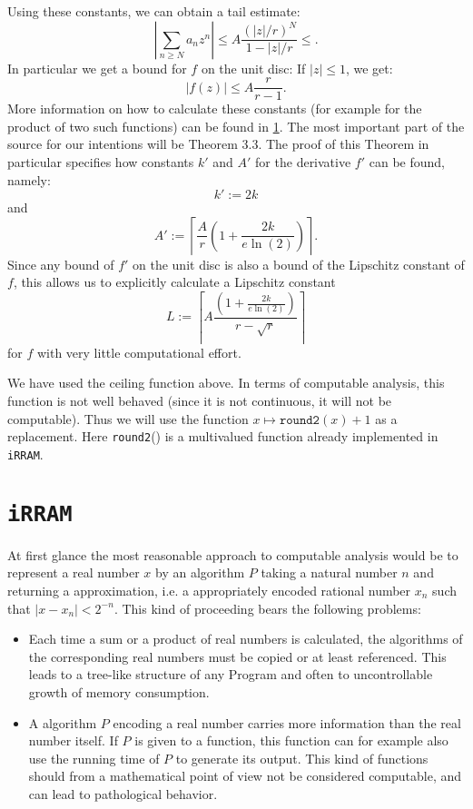 \documentclass{article}
\newcommand{\irram}{\texttt{iRRAM}\xspace}
\newcommand{\ir}[1]{\texttt{#1}}
\begin{document}
Using these constants, we can obtain a tail estimate:
\[ \left|\sum_{n \geq N} a_n z^n\right| \leq A \frac{(|z|/r)^N}{1- |z|/r} \leq. \]
In particular we get a bound for $f$ on the unit disc: If $|z|\leq 1$, we get:
\[ |f(z)| \leq A\frac r{r-1}. \]
More information on how to calculate these constants (for example for the product of two such functions) can be found in \ref{}. The most important part of the source for our intentions will be Theorem 3.3. The proof of this Theorem in particular specifies how constants $k'$ and $A'$ for the derivative $f'$ can be found, namely:
\[ k' := 2 k \]
and
\[ A' := \left\lceil \frac{A}{r} \left(1+ \frac{2k}{e \ln(2)}\right)\right\rceil. \]
Since any bound of $f'$ on the unit disc is also a bound of the Lipschitz constant of $f$, this allows us to explicitly calculate a Lipschitz constant
\[ L := \left\lceil A \frac{\left(1 + \frac{2k}{e\ln(2)}\right)}{r-\sqrt{r}}\right\rceil \]
for $f$ with very little computational effort.

We have used the ceiling function above. In terms of computable analysis, this function is not well behaved (since it is not continuous, it will not be computable). Thus we will use the function $x \mapsto \ir{round2}(x) +1$ as a replacement. Here \ir{round2}() is a multivalued function already implemented in \irram.

\section{\irram}

At first glance the most reasonable approach to computable analysis would be to represent a real number $x$ by an algorithm $P$ taking a natural number $n$ and returning a approximation, i.e. a appropriately encoded rational number $x_n$ such that $|x-x_n|<2^{-n}$. This kind of proceeding bears the following problems:
\begin{itemize}
\item Each time a sum or a product of real numbers is calculated, the algorithms of the corresponding real numbers must be copied or at least referenced. This leads to a tree-like structure of any Program and often to uncontrollable growth of memory consumption.
\item A algorithm $P$ encoding a real number carries more information than the real number itself. If $P$ is given to a function, this function can for example also use the running time of $P$ to generate its output. This kind of functions should from a mathematical point of view not be considered computable, and can lead to pathological behavior.
\end{itemize}
\end{document}
